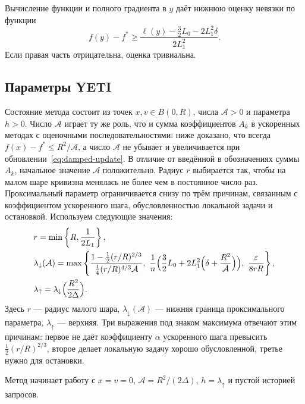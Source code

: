 \begin{corollary}\label{cor:curvature-lower-gap}
Вычисление функции и полного градиента в $y$ даёт нижнюю оценку невязки по функции
\[
 f(y)-f^\ast\ge
 \frac{\ell(y)-\tfrac32L_0-2L_1^2\delta}{2L_1^2}.
\]
Если правая часть отрицательна, оценка тривиальна.
\end{corollary}


\subsection{Параметры YETI}
Состояние метода состоит из точек $x,v\in B(0,R)$, числа
$\mathcal A>0$ и параметра $h>0$. Число $\mathcal A$ играет ту же роль,
что и сумма коэффициентов $A_k$ в ускоренных методах с оценочными
последовательностями: ниже доказано, что всегда
$f(x)-f^\ast\le R^2/\mathcal A$, а число $\mathcal A$ не убывает
и увеличивается при обновлении~\eqref{eq:damped-update}.
В отличие от введённой в обозначениях суммы $A_k$, начальное значение
$\mathcal A$ положительно. Радиус $r$ выбирается так, чтобы на малом шаре кривизна менялась
не более чем в постоянное число раз. Проксимальный параметр
ограничивается снизу по трём причинам, связанным с коэффициентом
ускоренного шага, обусловленностью локальной задачи и остановкой.
Используем следующие значения:
\begin{equation}\label{eq:outer-parameters}
 \begin{aligned}
 &r=\min\left\{R,\frac1{2L_1}\right\},\\
 &\lambda_\downarrow(\mathcal A)
 =\max\left\{\frac{1-\frac12(r/R)^{2/3}}{\frac14(r/R)^{4/3}\mathcal A},\
       \frac1n\Bigl(\frac32L_0+2L_1^2\Bigl(\delta+\frac{R^2}{\mathcal A}\Bigr)\Bigr),\
       \frac\varepsilon{8rR}\right\},\\
 &\lambda_{\uparrow}=\lambda_\downarrow\Bigl(\frac{R^2}{2\Delta}\Bigr).
 \end{aligned}
\end{equation}
Здесь $r$ --- радиус малого шара, $\lambda_\downarrow(\mathcal A)$ ---
нижняя граница проксимального параметра, $\lambda_{\uparrow}$ --- верхняя.
Три выражения под знаком максимума отвечают этим причинам: первое не даёт
коэффициенту $\alpha$ ускоренного шага превысить $\frac12(r/R)^{2/3}$, второе делает
локальную задачу хорошо обусловленной, третье нужно для остановки.

Метод начинает работу с $x=v=0$, $\mathcal A=R^2/(2\Delta)$, $h=\lambda_{\uparrow}$ и пустой
историей запросов.

